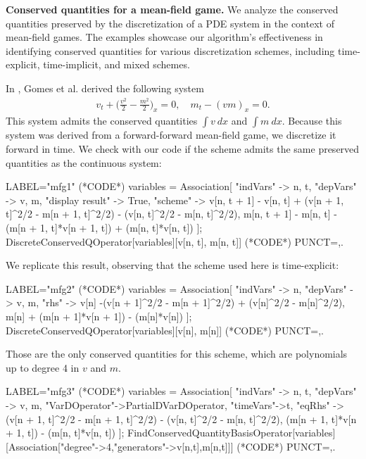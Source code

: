 \documentclass[runningheads]{llncs}
\newcommand{\1}{\chi}
\begin{document}
{\bf Conserved quantities for a mean-field game.}
We analyze the conserved quantities preserved by the discretization of a PDE system in the context of mean-field games.
The examples showcase our algorithm's effectiveness in identifying conserved quantities for various discretization schemes, including time-explicit, time-implicit, and mixed schemes.
\begin{example}
	In \cite{gomes18}, Gomes et al. derived the following system
	\begin{gather*}
		v_t+\Big(\frac{v^2}{2}-\frac{m^2}{2}\Big)_x=0,\quad
		m_t-(vm)_x=0.
	\end{gather*}
	This system admits the conserved quantities $\int v\ dx$ and $\int m\ dx$.
	Because this system was derived from a forward-forward mean-field game, we discretize it forward in time. We check with our code if the scheme admits the same preserved quantities as the continuous system:
	\begin{EXE}
		LABEL="mfg1"
		(*CODE*)
		variables = Association[
		"indVars" -> {n, t},
		"depVars" -> {v, m},
		"display result" -> True,
		"scheme" -> {v[n, t + 1] - 
			v[n, 
			t] + (v[n + 1, t]^2/2 - m[n + 1, t]^2/2) - (v[n, t]^2/2 - 
			m[n, t]^2/2), 
			m[n, t + 1] - 
			m[n, t] - (m[n + 1, t]*v[n + 1, t]) + (m[n, t]*v[n, t])}
		];
		DiscreteConservedQOperator[variables][{v[n, t], m[n, t]}]
		(*CODE*)
		PUNCT={,.}
	\end{EXE}
	\begin{small}
		
		
	\end{small}
We replicate this result, observing that the scheme used here is time-explicit:
	\begin{EXE}
		LABEL="mfg2"
		(*CODE*)
		variables = Association[
		"indVars" -> {n},
		"depVars" -> {v, m},
		"rhs" -> { 
			v[n] -(v[n + 1]^2/2 - m[n + 1]^2/2) + (v[n]^2/2 - 
			m[n]^2/2), 
			m[n] + (m[n + 1]*v[n + 1]) - (m[n]*v[n])}
		];
		DiscreteConservedQOperator[variables][{v[n], m[n]}]
		(*CODE*)
		PUNCT={,.}
	\end{EXE}
	\begin{small}
		
		
	\end{small}
	Those are the only conserved quantities for this scheme, which are polynomials up to degree 4 in $v$ and $m$.
	\begin{EXE}
		LABEL="mfg3"
		(*CODE*)
		variables = Association[
		"indVars" -> {n, t},
		"depVars" -> {v, m},
		"VarDOperator"->PartialDVarDOperator,
		"timeVars"->{t},
		"eqRhs" -> { 
			(v[n + 1, t]^2/2 - m[n + 1, t]^2/2) - (v[n, t]^2/2 - 
			m[n, t]^2/2), 
			(m[n + 1, t]*v[n + 1, t]) - (m[n, t]*v[n, t])}
		];
		FindConservedQuantityBasisOperator[variables][Association["degree"->4,"generators"->{v[n,t],m[n,t]}]]
		(*CODE*)
		PUNCT={,.}
	\end{EXE}
	\begin{small}
		
		
	\end{small}
\end{example}
\end{document}
